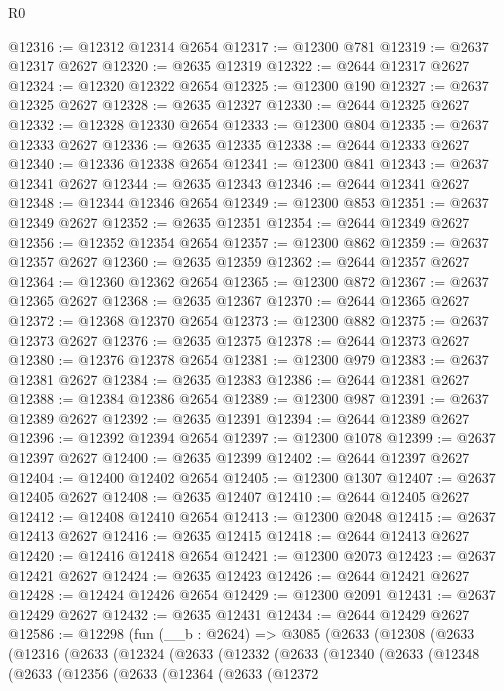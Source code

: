 \begin{lexlean}{R0}
\begin{coremodule}
@12316 := @12312 @12314 @2654
@12317 := @12300 @781
@12319 := @2637 @12317 @2627
@12320 := @2635 @12319
@12322 := @2644 @12317 @2627
@12324 := @12320 @12322 @2654
@12325 := @12300 @190
@12327 := @2637 @12325 @2627
@12328 := @2635 @12327
@12330 := @2644 @12325 @2627
@12332 := @12328 @12330 @2654
@12333 := @12300 @804
@12335 := @2637 @12333 @2627
@12336 := @2635 @12335
@12338 := @2644 @12333 @2627
@12340 := @12336 @12338 @2654
@12341 := @12300 @841
@12343 := @2637 @12341 @2627
@12344 := @2635 @12343
@12346 := @2644 @12341 @2627
@12348 := @12344 @12346 @2654
@12349 := @12300 @853
@12351 := @2637 @12349 @2627
@12352 := @2635 @12351
@12354 := @2644 @12349 @2627
@12356 := @12352 @12354 @2654
@12357 := @12300 @862
@12359 := @2637 @12357 @2627
@12360 := @2635 @12359
@12362 := @2644 @12357 @2627
@12364 := @12360 @12362 @2654
@12365 := @12300 @872
@12367 := @2637 @12365 @2627
@12368 := @2635 @12367
@12370 := @2644 @12365 @2627
@12372 := @12368 @12370 @2654
@12373 := @12300 @882
@12375 := @2637 @12373 @2627
@12376 := @2635 @12375
@12378 := @2644 @12373 @2627
@12380 := @12376 @12378 @2654
@12381 := @12300 @979
@12383 := @2637 @12381 @2627
@12384 := @2635 @12383
@12386 := @2644 @12381 @2627
@12388 := @12384 @12386 @2654
@12389 := @12300 @987
@12391 := @2637 @12389 @2627
@12392 := @2635 @12391
@12394 := @2644 @12389 @2627
@12396 := @12392 @12394 @2654
@12397 := @12300 @1078
@12399 := @2637 @12397 @2627
@12400 := @2635 @12399
@12402 := @2644 @12397 @2627
@12404 := @12400 @12402 @2654
@12405 := @12300 @1307
@12407 := @2637 @12405 @2627
@12408 := @2635 @12407
@12410 := @2644 @12405 @2627
@12412 := @12408 @12410 @2654
@12413 := @12300 @2048
@12415 := @2637 @12413 @2627
@12416 := @2635 @12415
@12418 := @2644 @12413 @2627
@12420 := @12416 @12418 @2654
@12421 := @12300 @2073
@12423 := @2637 @12421 @2627
@12424 := @2635 @12423
@12426 := @2644 @12421 @2627
@12428 := @12424 @12426 @2654
@12429 := @12300 @2091
@12431 := @2637 @12429 @2627
@12432 := @2635 @12431
@12434 := @2644 @12429 @2627
@12586 := @12298
    (fun (__b : @2624) =>
    @3085
      (@2633
        (@12308
          (@2633
            (@12316
              (@2633
                (@12324
                  (@2633
                    (@12332
                      (@2633
                        (@12340
                          (@2633
                            (@12348
                              (@2633
                                (@12356
                                  (@2633
                                    (@12364
                                      (@2633
                                        (@12372

\end{coremodule}
\end{lexlean}
